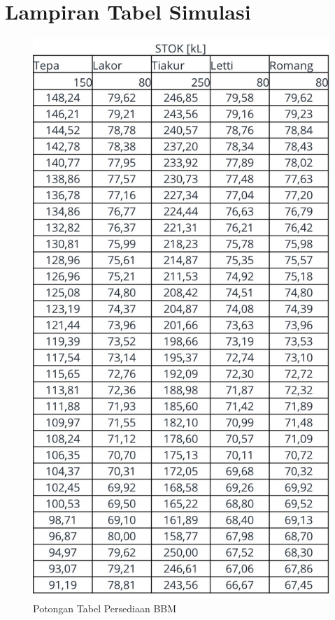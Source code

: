 \section*{Lampiran Tabel Simulasi}
\label{sec:lampiran-simulasi}

\begin{figure}[!ht]
    \centering
    \includegraphics[width=\linewidth,height=\textheight,keepaspectratio]{lampiran/tabel-stok-simu.jpg}
    \caption*{Potongan Tabel Persediaan BBM}
\end{figure}

